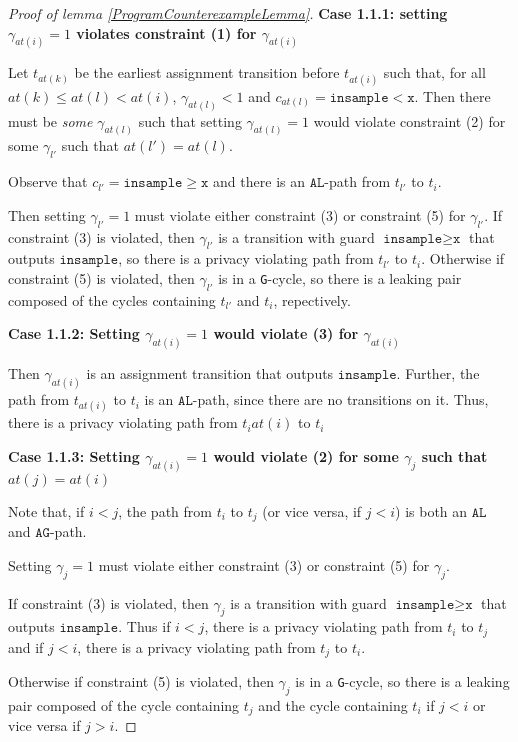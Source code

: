 \documentclass[12pt]{article}
\newcommand{\gguard}[1][x]{\texttt{insample}\geq #1}
\newcommand{\lguard}[1][x]{\texttt{insample} < #1}
\newcommand{\gcycle}{\texttt{G}-cycle}
\theoremstyle{definition}
\begin{document}
\begin{proof}[Proof of lemma \ref{ProgramCounterexampleLemma}]
    \textbf{Case 1.1.1: setting $\gamma_{at(i)} = 1$ violates constraint (1) for $\gamma_{at(i)}$}

    Let $t_{at(k)}$ be the earliest assignment transition before $t_{at(i)}$ such that, for all $at(k)\leq at(l)< at(i)$, $\gamma_{at(l)} <1$ and $c_{at(l)} = \lguard[\texttt{x}]$. Then there must be \textit{some} $\gamma_{at(l)}$ such that setting $\gamma_{at(l)} = 1$ would violate constraint (2) for some $\gamma_{l'}$ such that $at(l') = at(l)$. 

    Observe that $c_{l'} = \gguard[\texttt{x}]$ and there is an $\texttt{AL}$-path from $t_{l'}$ to $t_i$. 

    Then setting $\gamma_{l'}= 1$ must violate either constraint (3) or constraint (5) for $\gamma_{l'}$. If constraint (3) is violated, then $\gamma_{l'}$ is a transition with guard $\gguard[\texttt{x}]$ that outputs $\texttt{insample}$, so there is a privacy violating path from $t_{l'}$ to $t_i$. Otherwise if constraint (5) is violated, then $\gamma_{l'}$ is in a \gcycle, so there is a leaking pair composed of the cycles containing $t_{l'}$ and $t_i$, repectively. 

    \textbf{Case 1.1.2: Setting $\gamma_{at(i)}=1$ would violate (3) for $\gamma_{at(i)}$}

    Then $\gamma_{at(i)}$ is an assignment transition that outputs $\texttt{insample}$. Further, the path from $t_{at(i)}$ to $t_i$ is an $\texttt{AL}$-path, since there are no transitions on it. Thus, there is a privacy violating path from $t_i{at(i)}$ to $t_i$

    \textbf{Case 1.1.3: Setting $\gamma_{at(i)}=1$ would violate (2) for some $\gamma_j$ such that $at(j)= at(i)$}

    Note that, if $i<j$, the path from $t_i$ to $t_j$ (or vice versa, if $j<i$) is both an $\texttt{AL}$ and $\texttt{AG}$-path.

    Setting $\gamma_{j}= 1$ must violate either constraint (3) or constraint (5) for $\gamma_{j}$. 
    
    If constraint (3) is violated, then $\gamma_{j}$ is a transition with guard $\gguard[\texttt{x}]$ that outputs $\texttt{insample}$. Thus if $i<j$, there is a privacy violating path from $t_i$ to $t_j$ and if $j<i$, there is a privacy violating path from $t_j$ to $t_i$. 
    
    Otherwise if constraint (5) is violated, then $\gamma_{j}$ is in a \gcycle, so there is a leaking pair composed of the cycle containing $t_j$ and the cycle containing $t_i$ if $j<i$ or vice versa if $j>i$. 


\end{proof}
\end{document}
